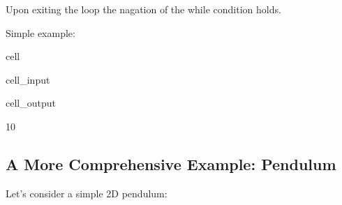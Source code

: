 \documentclass[a4paper,10pt,english]{jupyterBook}
\begin{document}
\sphinxAtStartPar
Upon exiting the loop the nagation of the while condition holds.

\sphinxAtStartPar
Simple example:

\begin{sphinxuseclass}{cell}\begin{sphinxVerbatimInput}

\begin{sphinxuseclass}{cell_input}
\begin{sphinxVerbatim}[commandchars=\\\{\}]

\end{sphinxVerbatim}

\end{sphinxuseclass}\end{sphinxVerbatimInput}
\begin{sphinxVerbatimOutput}

\begin{sphinxuseclass}{cell_output}
\begin{sphinxVerbatim}[commandchars=\\\{\}]
10
\end{sphinxVerbatim}

\end{sphinxuseclass}\end{sphinxVerbatimOutput}

\end{sphinxuseclass}

\subsection{A More Comprehensive Example: Pendulum}
\label{\detokenize{text/progtut/while:a-more-comprehensive-example-pendulum}}\label{\detokenize{text/progtut/while:pendulum-example}}
\sphinxAtStartPar
Let’s consider a simple 2D pendulum:

\begin{sphinxShadowBox}

\sphinxAtStartPar
{}
\end{sphinxShadowBox}
\end{document}
